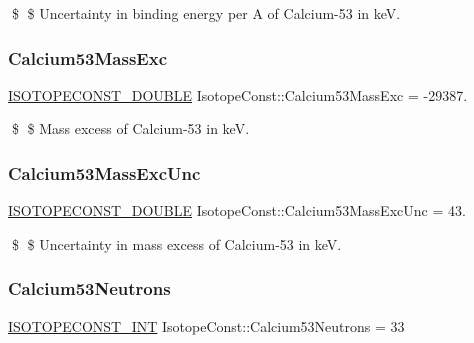 \$ \$ Uncertainty in binding energy per A of Calcium-\/53 in keV. \mbox{\label{group___isotope_const-_calcium-_ca53_ga785835c89cadb8b5ba9963ea56235baf}} 
\subsubsection{\texorpdfstring{Calcium53\+Mass\+Exc}{Calcium53MassExc}}
{\footnotesize\ttfamily \mbox{\hyperlink{group___isotope_const-_macros_ga8f45a7272ce02c0b4c65c44636ed719a}{I\+S\+O\+T\+O\+P\+E\+C\+O\+N\+S\+T\+\_\+\+D\+O\+U\+B\+LE}} Isotope\+Const\+::\+Calcium53\+Mass\+Exc = -\/29387.}

\$ \$ Mass excess of Calcium-\/53 in keV. \mbox{\label{group___isotope_const-_calcium-_ca53_ga8104c5c4439b71ec543fc30f41ebcb0f}} 
\subsubsection{\texorpdfstring{Calcium53\+Mass\+Exc\+Unc}{Calcium53MassExcUnc}}
{\footnotesize\ttfamily \mbox{\hyperlink{group___isotope_const-_macros_ga8f45a7272ce02c0b4c65c44636ed719a}{I\+S\+O\+T\+O\+P\+E\+C\+O\+N\+S\+T\+\_\+\+D\+O\+U\+B\+LE}} Isotope\+Const\+::\+Calcium53\+Mass\+Exc\+Unc = 43.}

\$ \$ Uncertainty in mass excess of Calcium-\/53 in keV. \mbox{\label{group___isotope_const-_calcium-_ca53_ga57c4847d66ff2899c56688d1ebc0bbe0}} 
\subsubsection{\texorpdfstring{Calcium53\+Neutrons}{Calcium53Neutrons}}
{\footnotesize\ttfamily \mbox{\hyperlink{group___isotope_const-_macros_ga5f18360b3e99483a35c32d789e62621c}{I\+S\+O\+T\+O\+P\+E\+C\+O\+N\+S\+T\+\_\+\+I\+NT}} Isotope\+Const\+::\+Calcium53\+Neutrons = 33}

